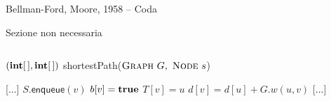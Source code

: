 \begin{frame}{Bellman-Ford, Moore, 1958 -- Coda}

\smallskip
{}
\BI
\item Sezione non necessaria
\EI

\vspace{-18pt}
\begin{columns}
\small
\begin{Procedure}
\caption[A]{$(\INTARRAY, \INTARRAY)$ \textsf{shortestPath}($\textsc{Graph}\ G,\ \textsc{Node}\ s$)}
[...]\;
    {
      {
        $S.\textsf{enqueue}(v)$\;
        $b[v] = \TRUE$\;
      }
      $T[v] = u$\;
      $d[v] = d[u] + G.w(u,v)$\;
    }
[...]\;
\end{Procedure}
\end{columns}

\end{frame}



